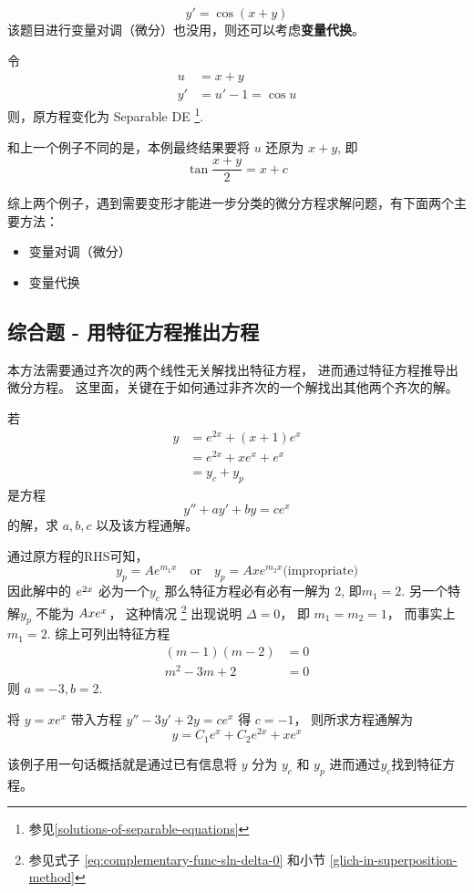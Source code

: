 \begin{example}
    \[
        y' = \cos (x+y)
    \]
    该题目进行变量对调（微分）也没用，则还可以考虑\textbf{变量代换}。

    令
    \begin{align*}
        u &= x+ y \\
        y' &= u' - 1 = \cos u
    \end{align*}
    则，原方程变化为 Separable DE
    \footnote{参见\ref{solutions-of-separable-equations}}.

    和上一个例子不同的是，本例最终结果要将 $u$ 还原为 $x+y$, 即
    \[
        \tan \dfrac{x+y}{2} = x + c
    \]
\end{example}

综上两个例子，遇到需要变形才能进一步分类的微分方程求解问题，有下面两个主要方法：
\begin{itemize}
    \item 变量对调（微分）
    \item 变量代换
\end{itemize}

\subsection{综合题 - 用特征方程推出方程}

本方法需要通过齐次的两个线性无关解找出特征方程，
进而通过特征方程推导出微分方程。
这里面，关键在于如何通过非齐次的一个解找出其他两个齐次的解。

\begin{example}
    若 
    \begin{align*}
        y &= e^{2x} + (x+1) e^x \\
          &= e^{2x} + x e^x + e^x \\
          &= y_c + y_p
    \end{align*}
    是方程 
    \[
        y'' + ay' + by = ce^{x}
    \]
    的解，求 $a, b, c$ 以及该方程通解。

    \cite[page 145, pdf 156]{we}
    
    通过原方程的RHS可知，
    \[
        y_p = Ae^{m_1x} 
        \quad \mbox{or} \quad 
        y_p = Axe^{m_2x} \mbox{(impropriate)}
    \]
    因此解中的 $\cramped{e^{2x}}$ 必为一个$y_c$ 
    那么特征方程必有必有一解为 $2$, 即$m_1 = 2$.
    另一个特解$y_p$ 不能为 $\cramped{Axe^x}$，
    这种情况
    \footnote{
        参见式子
        \ref{eq:complementary-func-sln-delta-0}
        和小节
        \ref{glich-in-superposition-method}
    }
    出现说明 $\Delta = 0$，
    即 $m_1 = m_2 = 1$，
    而事实上$m_1 = 2$.
    综上可列出特征方程
    \begin{align*}
        (m-1)(m-2) &= 0\\
        m^2 - 3m + 2 &= 0
    \end{align*}
    则 $a = -3, b = 2$.

    将 $y = xe^x$ 带入方程 $y'' - 3y' + 2y = ce^x$ 得 $c = -1$，
    则所求方程通解为
    \[
        y = C_1 e^x + C_2 e^{2x} + xe^x
    \]
\end{example}
该例子用一句话概括就是通过已有信息将 $y$ 分为 $y_c$ 和 $y_p$
进而通过$y_c$找到特征方程。

